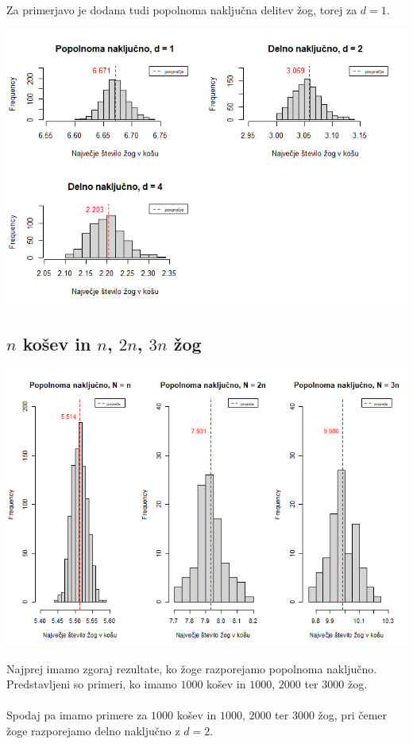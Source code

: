 \documentclass[a4paper, 11pt]{article}
\begin{document}
Za primerjavo je dodana tudi popolnoma naključna delitev žog, torej za $d = 1$.

\includegraphics[scale=0.6]{delno_nakljucno.png}

\subsection{$n$ košev in $n$, $2n$, $3n$ žog}

\includegraphics[scale=0.60]{popolnoma_nakljucno2.png}

Najprej imamo zgoraj rezultate, ko žoge razporejamo popolnoma naključno.
Predstavljeni so primeri, ko imamo $1000$ košev in $1000$, $2000$ ter $3000$ žog.
\\
\\
Spodaj pa imamo primere za $1000$ košev in $1000$, $2000$ ter $3000$ žog, pri čemer žoge 
razporejamo delno naključno z $d = 2$. 
\end{document}
